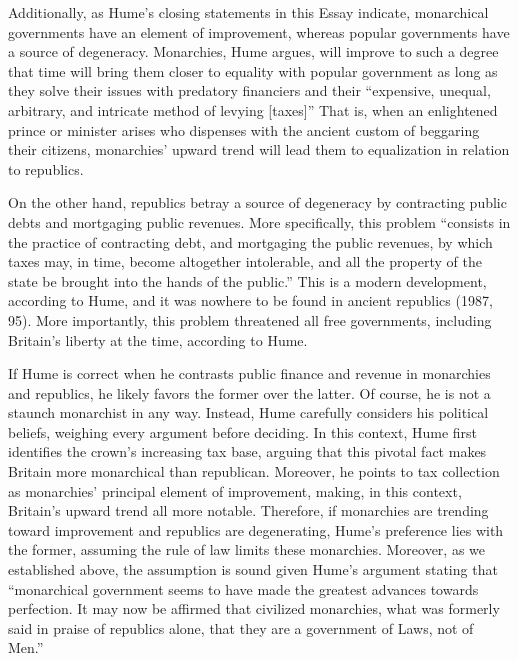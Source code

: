 \documentclass[authordate]{turabian-researchpaper}
\begin{document}
Additionally, as Hume’s closing statements in this Essay indicate, monarchical governments have an element of improvement, whereas popular governments have a source of degeneracy.\autocite[95-6]{Hume_1985} Monarchies, Hume argues, will improve to such a degree that time will bring them closer to equality with popular government as long as they solve their issues with predatory financiers and their “expensive, unequal, arbitrary, and intricate method of levying [taxes]” \autocite[95]{Hume_1985} That is, when an enlightened prince or minister arises who dispenses with the ancient custom of beggaring their citizens, monarchies’ upward trend will lead them to equalization in relation to republics. 

On the other hand, republics betray a source of degeneracy by contracting public debts and mortgaging public revenues.\autocite[95]{Hume_1985} More specifically, this problem “consists in the practice of contracting debt, and mortgaging the public revenues, by which taxes may, in time, become altogether intolerable, and all the property of the state be brought into the hands of the public.” \autocite[96]{Hume_1985} This is a modern development, according to Hume, and it was nowhere to be found in ancient republics (1987, 95). More importantly, this problem threatened all free governments, including Britain’s liberty at the time, according to Hume.\autocite[96]{Hume_1985}

If Hume is correct when he contrasts public finance and revenue in monarchies and republics, he likely favors the former over the latter. Of course, he is not a staunch monarchist in any way. Instead, Hume carefully considers his political beliefs, weighing every argument before deciding. In this context, Hume first identifies the crown’s increasing tax base, arguing that this pivotal fact makes Britain more monarchical than republican.\autocite[51]{Hume_1985} Moreover, he points to tax collection as monarchies’ principal element of improvement, making, in this context, Britain’s upward trend all more notable. Therefore, if monarchies are trending toward improvement and republics are degenerating, Hume’s preference lies with the former, assuming the rule of law limits these monarchies. Moreover, as we established above, the assumption is sound given Hume’s argument stating that “monarchical government seems to have made the greatest advances towards perfection. It may now be affirmed that civilized monarchies, what was formerly said in praise of republics alone, that they are a government of Laws, not of Men.”\autocite[94]{Hume_1985} 
\end{document}
